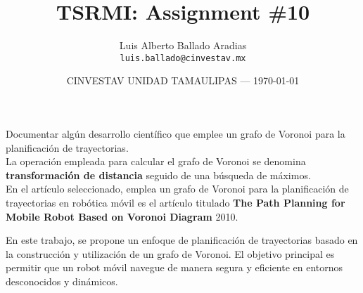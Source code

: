 \documentclass{article}
\title{TSRMI: Assignment \#10} %
\author{Luis Alberto Ballado Aradias\\ \texttt{luis.ballado@cinvestav.mx}} %
\date{CINVESTAV UNIDAD TAMAULIPAS --- \today} %
\begin{document}
\maketitle %


Documentar algún desarrollo científico que emplee un grafo de Voronoi para la planificación de trayectorias. \\
La operación empleada para calcular el grafo de Voronoi se denomina \textbf{transformación de distancia} seguido de una búsqueda de máximos.\\

En el artículo seleccionado, emplea un grafo de Voronoi para la planificación de trayectorias en robótica móvil es el artículo titulado \textbf{The Path Planning for Mobile Robot Based on Voronoi Diagram} 2010.

En este trabajo, se propone un enfoque de planificación de trayectorias basado en la construcción y utilización de un grafo de Voronoi. El objetivo principal es permitir que un robot móvil navegue de manera segura y eficiente en entornos desconocidos y dinámicos.
\end{document}
